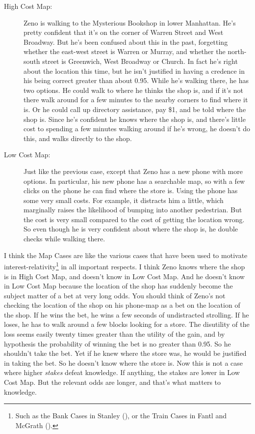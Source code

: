 \documentclass[
  11pt,
  letterpaper,
  DIV=11,
  numbers=noendperiod,
  twoside]{scrartcl}
\begin{document}
\begin{description}
\item[High Cost Map:]
Zeno is walking to the Mysterious Bookshop in lower Manhattan. He's
pretty confident that it's on the corner of Warren Street and West
Broadway. But he's been confused about this in the past, forgetting
whether the east-west street is Warren or Murray, and whether the
north-south street is Greenwich, West Broadway or Church. In fact he's
right about the location this time, but he isn't justified in having a
credence in his being correct greater than about 0.95. While he's
walking there, he has two options. He could walk to where he thinks the
shop is, and if it's not there walk around for a few minutes to the
nearby corners to find where it is. Or he could call up directory
assistance, pay \$1, and be told where the shop is. Since he's confident
he knows where the shop is, and there's little cost to spending a few
minutes walking around if he's wrong, he doesn't do this, and walks
directly to the shop.
\item[Low Cost Map:]
Just like the previous case, except that Zeno has a new phone with more
options. In particular, his new phone has a searchable map, so with a
few clicks on the phone he can find where the store is. Using the phone
has some very small costs. For example, it distracts him a little, which
marginally raises the likelihood of bumping into another pedestrian. But
the cost is very small compared to the cost of getting the location
wrong. So even though he is very confident about where the shop is, he
double checks while walking there.
\end{description}

I think the Map Cases are like the various cases that have been used to
motivate interest-relativity\footnote{Such as the Bank Cases in Stanley
  (), or the Train Cases in Fantl
  and McGrath ().} in all important
respects. I think Zeno knows where the shop is in High Cost Map, and
doesn't know in Low Cost Map. And he doesn't know in Low Cost Map
because the location of the shop has suddenly become the subject matter
of a bet at very long odds. You should think of Zeno's not checking the
location of the shop on his phone-map as a bet on the location of the
shop. If he wins the bet, he wins a few seconds of undistracted
strolling. If he loses, he has to walk around a few blocks looking for a
store. The disutility of the loss seems easily twenty times greater than
the utility of the gain, and by hypothesis the probability of winning
the bet is no greater than 0.95. So he shouldn't take the bet. Yet if he
knew where the store was, he would be justified in taking the bet. So he
doesn't know where the store is. Now this is not a case where higher
\emph{stakes} defeat knowledge. If anything, the stakes are lower in Low
Cost Map. But the relevant odds are longer, and that's what matters to
knowledge.
\end{document}
